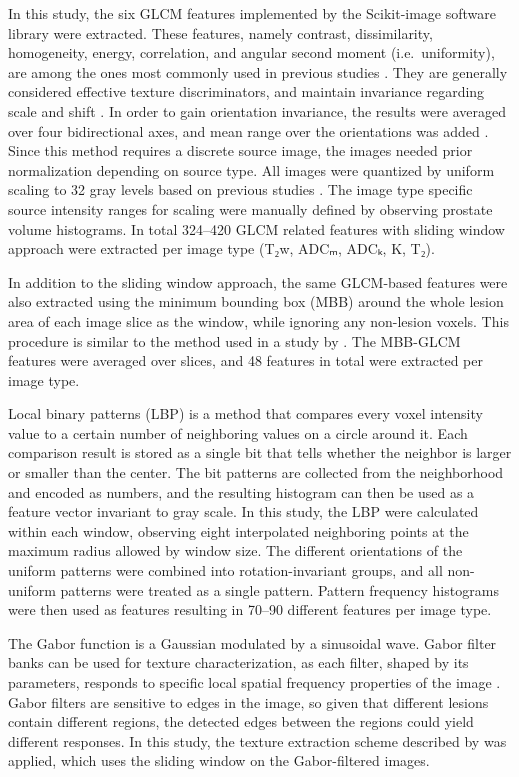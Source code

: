In this study, the six GLCM features implemented by the Scikit-image software
library \citep{VanderWalt2014} were extracted. These features, namely contrast,
dissimilarity, homogeneity, energy, correlation, and angular second moment
(i.e.\ uniformity), are among the ones most commonly used in previous studies
\citep{Clausi2002Rapid}. They are generally considered effective texture
discriminators, and maintain invariance regarding scale and shift
\citep{Clausi2002Analysis}. In order to gain orientation invariance, the results
were averaged over four bidirectional axes, and mean range over the orientations
was added \citep{Haralick1973}. Since this method requires a discrete source
image, the images needed prior normalization depending on source type. All
images were quantized by uniform scaling to 32 gray levels based on previous
studies \citep{Clausi2002Analysis, Clausi2002Rapid, Albregtsen2008}. The image
type specific source intensity ranges for scaling were manually defined by
observing prostate volume histograms. In total 324--420 GLCM related features
with sliding window approach were extracted per image type (T₂w, ADCₘ, ADCₖ, K,
T₂).

In addition to the sliding window approach, the same GLCM-based features were
also extracted using the minimum bounding box (MBB) around the whole lesion
area of each image slice as the window, while ignoring any non-lesion voxels.
This procedure is similar to the method used in a study by \citet{Vignati2015}.
The MBB-GLCM features were averaged over slices, and 48 features in total were
extracted per image type.

Local binary patterns (LBP) \citep{Ojala1996} is a method that compares every
voxel intensity value to a certain number of neighboring values on a circle
around it. Each comparison result is stored as a single bit that tells whether
the neighbor is larger or smaller than the center. The bit patterns are
collected from the neighborhood and encoded as numbers, and the resulting
histogram can then be used as a feature vector invariant to gray scale. In this
study, the LBP were calculated within each window, observing eight interpolated
neighboring points at the maximum radius allowed by window size. The different
orientations of the uniform patterns were combined into rotation-invariant
groups, and all non-uniform patterns were treated as a single pattern. Pattern
frequency histograms were then used as features resulting in 70--90 different
features per image type.

The Gabor function \citep{Gabor1946} is a Gaussian modulated by a sinusoidal
wave. Gabor filter banks can be used for texture characterization, as each
filter, shaped by its parameters, responds to specific local spatial frequency
properties of the image \citep{Turner1986}. Gabor filters are sensitive to edges
in the image, so given that different lesions contain different regions, the
detected edges between the regions could yield different responses. In this
study, the texture extraction scheme described by \citet{Tuceryan1998} was
applied, which uses the sliding window on the Gabor-filtered images.


